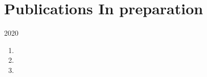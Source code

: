 \section*{Publications {\small In preparation}}

\begin{paracol}{2}
  \textsc{2020}
\switchcolumn
  \begin{enumerate}
    \setcounter{enumi}{\thepubcounter}
    \item {}
    \item {}
    \item {}
    \setcounter{pubcounter}{\theenumi}
  \end{enumerate}
\end{paracol}